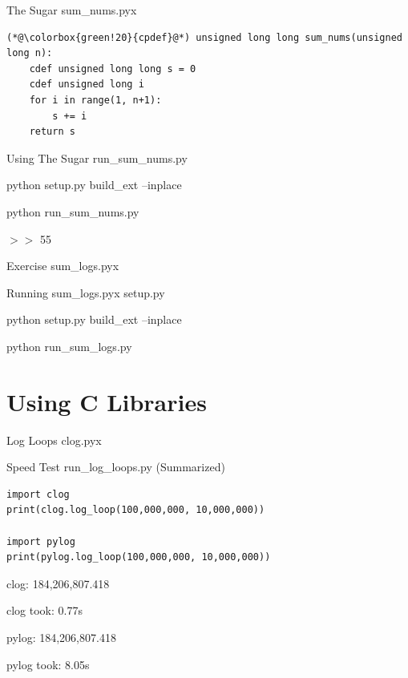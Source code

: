 \documentclass[11pt]{beamer}
\begin{document}
\begin{frame}[fragile]{The Sugar}
    sum\_nums.pyx
    \begin{lstlisting}
(*@\colorbox{green!20}{cpdef}@*) unsigned long long sum_nums(unsigned long n):
    cdef unsigned long long s = 0
    cdef unsigned long i
    for i in range(1, n+1):
        s += i
    return s
    \end{lstlisting}
\end{frame}

\begin{frame}[fragile]{Using The Sugar}
    run\_sum\_nums.py
    

	\vspace{1cm}

    \pause
    python setup.py build\_ext --inplace

    python run\_sum\_nums.py

    \pause
    $>>$ 55

\end{frame}

\begin{frame}[fragile]{Exercise}
    sum\_logs.pyx
    \pause
    
\end{frame}

\begin{frame}[fragile]{Running sum\_logs.pyx}
	setup.py
	
	
	\pause
	python setup.py build\_ext --inplace

	python run\_sum\_logs.py
\end{frame}

\section{Using C Libraries}
\begin{frame}[fragile]{Log Loops}
    clog.pyx
    
\end{frame}

\begin{frame}[fragile]{Speed Test}
	run\_log\_loops.py (Summarized)
	\begin{lstlisting}
import clog
print(clog.log_loop(100,000,000, 10,000,000))

import pylog
print(pylog.log_loop(100,000,000, 10,000,000))
	\end{lstlisting}
	
	\vspace{1cm}
	
	\pause
	\begin{minipage}{0.45\linewidth}
		clog: 184,206,807.418

		clog took: 0.77s
	\end{minipage}
	\begin{minipage}{0.45\linewidth}
		pylog: 184,206,807.418
	
		pylog took: 8.05s
	\end{minipage}
	
	\vspace{1cm}

\end{frame}
\end{document}

